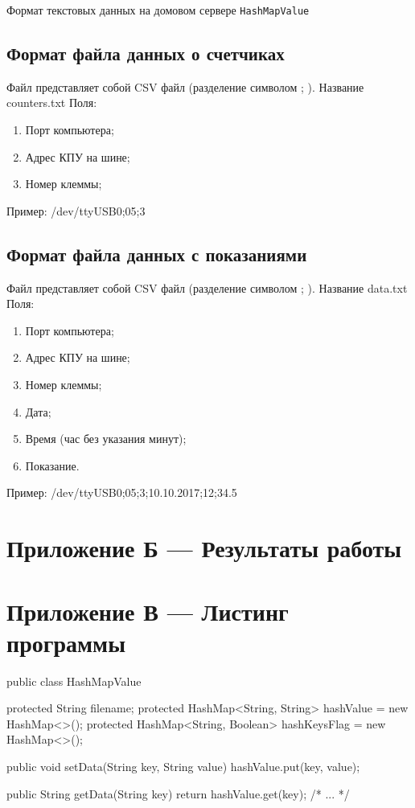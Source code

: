 \documentclass[a4paper,12pt]{article}
\begin{document}
\begin{center}
Формат текстовых данных на домовом сервере \verb|HashMapValue|
\end{center}

\subsection*{Формат файла данных о счетчиках}
Файл представляет собой CSV файл (разделение символом ; ). Название counters.txt
Поля:
\begin{enumerate}
	\item Порт компьютера;
	\item Адрес КПУ на шине;
	\item Номер клеммы;
\end{enumerate}
Пример: /dev/ttyUSB0;05;3

\subsection*{Формат файла данных с показаниями}
Файл представляет собой CSV файл (разделение символом ; ). Название data.txt
Поля:
\begin{enumerate}
	\item Порт компьютера;
	\item Адрес КПУ на шине;
	\item Номер клеммы;
	\item Дата;
	\item Время (час без указания минут);
	\item Показание.
\end{enumerate}
Пример: /dev/ttyUSB0;05;3;10.10.2017;12;34.5

\pagebreak
\section*{ \centering Приложение Б --- Результаты работы} 
\pagebreak

\section*{ \centering Приложение В --- Листинг программы} 

\begin{MyCode}
	
	public class HashMapValue {
		
		protected String filename; 
		protected HashMap<String, String> hashValue = 
		new HashMap<>();
		protected HashMap<String, Boolean> hashKeysFlag =
		new HashMap<>();
		
		public void setData(String key, String value) {
			hashValue.put(key, value);
		}
		
		public String getData(String key) {
			return hashValue.get(key);
		}
		/* ... */
	}
\end{MyCode}
\end{document}
